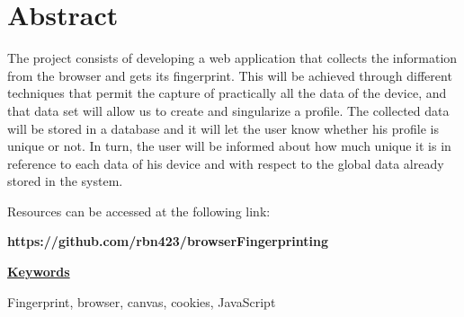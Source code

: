 \chapter*{Abstract}

The project consists of developing a web application that collects the information from the browser and gets its fingerprint. This will be achieved through different techniques that permit the capture of practically all the data of the device, and that data set will allow us to create and singularize a profile. The collected data will be stored in a database and it will let the user know whether his profile is unique or not. In turn, the user will be informed about how much unique it is in reference to each data of his device and with respect to the global data already stored in the system. \par

Resources can be accessed at the following link: \par
\noindent
\textbf{https://github.com/rbn423/browserFingerprinting} \par
\vspace{12mm}
\noindent
\underline{\Large{\textbf{Keywords}}}\par
\vspace{7mm}
\noindent
\normalsize{Fingerprint, browser, canvas, cookies, JavaScript}